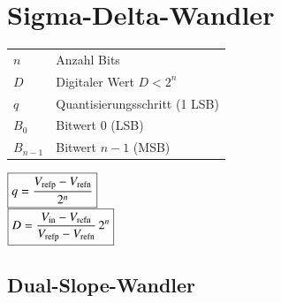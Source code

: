 

\section{Sigma-Delta-Wandler}

\begin{minipage}{0.68\linewidth}
    \begin{tabular}{ll}
        $n$ & Anzahl Bits \\
        $D$ & Digitaler Wert \quad $D < 2^n$ \\
        $q$ & Quantisierungsschritt (1 LSB) \\
        $B_0$ & Bitwert 0 (LSB) \\
        $B_{n-1}$ & Bitwert $n-1$ (MSB)
    \end{tabular}
\end{minipage}
\hfill
\begin{minipage}{0.3\linewidth}
    $ \boxed{ q = \frac{V_{\rm refp} - V_{\rm refn}}{2^n} } $ \\
    $ \boxed{ D = \frac{V_{\rm in} - V_{\rm refn}}{V_{\rm refp} - V_{\rm refn}} \, 2^n }  $
\end{minipage}


\subsection{Dual-Slope-Wandler}

